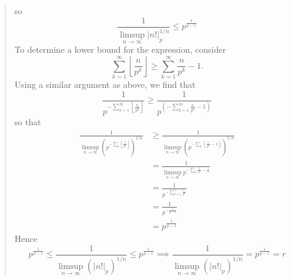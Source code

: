 \documentclass{hw}
\begin{document}
\begin{enumerate}
\begin{quote}
\[			  \]
			  so
			  \[
			  	\frac{1}{\limsup_{n\to\infty}|n!|_{p}^{1/n}} \leq p^{\frac{1}{p-1}}
			  \]
			  To determine a lower bound for the expression, consider
			  \[
			  	\sum_{k=1}^{\infty}\left\lfloor\frac{n}{p^{k}}\right\rfloor \geq \sum_{k=1}^{\infty}\frac{n}{p^{k}}-1.
			  \]
			  Using a similar argument as above, we find that
			  \[
			  	\frac{1}{p^{-\sum_{k=1}^{\infty}\left\lfloor\frac{n}{p^{k}}\right\rfloor}} \geq
				\frac{1}{p^{\left(-\sum_{k=1}^{\infty}\frac{n}{p^{k}}-1\right)}}
			  \]
			  so that
			  \begin{align*}
				\frac{1}{\limsup_{n\to\infty}\left(p^{-\sum_{k}\left\lfloor\frac{n}{p^k}\right\rfloor}\right)^{1/n}} &\geq
				\frac{1}{\limsup_{n\to\infty}\left(p^{-\sum_{k}\left(\frac{n}{p^k}-1\right)}\right)^{1/n}}\\
				&=\frac{1}{\limsup_{n\to\infty}p^{-\sum_{k}\frac{1}{p^k}-\frac{1}{n}}}\\
				&= \frac{1}{p^{-\sum_{k=1}^{\infty}\frac{1}{p^{k}}}}\\
				&= \frac{1}{p^{-\frac{1}{p-1}}}\\
				&= p^{\frac{1}{p-1}}
			  \end{align*}
			  Hence
			  \[
			  	p^{\frac{1}{p-1}}\leq
				\frac{1}{\limsup_{n\to\infty}(|n!|_{p})^{1/n}}
				\leq p^{\frac{1}{p-1}}\implies
				\frac{1}{\limsup_{n\to\infty}(|n!|_{p})^{1/n}} = p^{\frac{1}{p-1}}=r
			  \]
		  \end{quote}
\end{enumerate}
\end{document}
